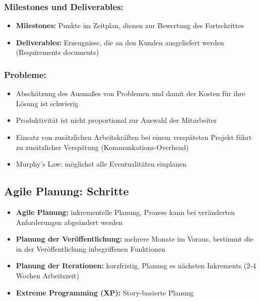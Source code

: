 \subsubsection{Milestones und Deliverables:}
\begin{itemize}
    \item \textbf{Milestones:} Punkte im Zeitplan, dienen zur Bewertung des Fortschrittes
    \item \textbf{Deliverables:} Erzeugnisse, die an den Kunden ausgeliefert werden (Requirements documents)
\end{itemize}

\subsubsection{Probleme:}
\begin{itemize}
    \item Abschätzung des Ausmaßes von Problemen und damit der Kosten für ihre Lösung ist schwierig
    \item Produktivität ist nicht proportional zur Auswahl der Mitarbeiter 
    \item Einsatz von zusätzlichen Arbeitskräften bei einem verspäteten Projekt führt zu zusätzlicher Verspätung (Kommunkations-Overhead)
    \item Murphy's Law: möglichst alle Eventualitäten einplanen
\end{itemize}

\subsection{Agile Planung: Schritte}
\begin{itemize}
    \item \textbf{Agile Planung:} inkrementelle Planung, Prozess kann bei veränderten Anforderungen abgeändert werden
    \item \textbf{Planung der Veröffentlichung:} mehrere Monate im Voraus, bestimmt die in der Veröffentlichung inbegriffenen Funktionen
    \item \textbf{Planung der Iterationen:} kurzfristig, Planung es nächsten Inkrements (2-4 Wochen Arbeitszeit)
    \item \textbf{Extreme Programming (XP):} Story-basierte Planung 
\end{itemize}

